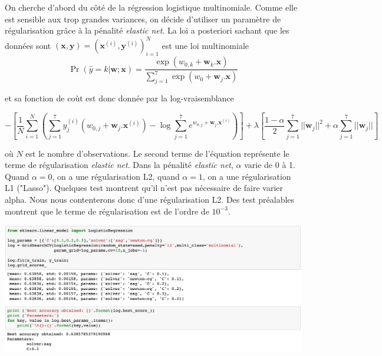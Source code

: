 \documentclass[12pt,a4paper]{article}
\numberwithin{equation}{section}
\begin{document}
	On cherche d'abord du côté de la régression logistique multinomiale. Comme elle est sensible aux trop grandes variances, on décide d'utiliser un paramètre de régularisation grâce à la pénalité \textit{elastic net}. La loi a posteriori sachant que les données sont $(\textbf{x},\textbf{y}) = (\textbf{x}^{(i)},\textbf{y}^{(i)})_{i=1}^N$ est une loi multinomiale 
	$$\Pr (\widehat{y}=k \vert \textbf{w};\textbf{x}) = \frac{\exp(w_{0,k} + \textbf{w}_k .\textbf{x})}{\sum_{j=1}^7 \exp(w_0 + \textbf{w}_j . \textbf{x})} $$ 
	
	et sa fonction de coùt est donc donnée par la log-vraisemblance 
	
	$$- \left[\frac{1}{N} \sum_{i=1}^{N} \left( \sum_{j=1}^7 y^{(i)}_j (w_{0,j} + \textbf{w}_j.\textbf{x}^{(i)}) - \log \sum_{j=1}^7 e^{w_{0,j} + \textbf{w}_j . \textbf{x}^{(i)}} \right) \right] + \lambda \left[ \frac{1 - \alpha}{2} \sum_{j=1}^7 \vert \vert \textbf{w}_j \vert \vert^2 + \alpha \sum_{j=1}^7 \vert \vert \textbf{w}_j \vert \vert \right]$$
	
	où $N$ est le nombre d'observations. Le second terme de l'équation représente le terme de régularisation \textit{elastic net}. Dans la pénalité \textit{elastic net}, $\alpha$ varie de 0 à 1. Quand $\alpha=0$, on a une régularisation L2, quand $\alpha=1$, on a une régularisation L1 ("Lasso"). Quelques test montrent qu'il n'est pas nécessaire de faire varier alpha. Nous nous contenterons donc d'une régularisation L2. Des test préalables montrent que le terme de régularisation est de l'ordre de $10^{-3}$.\\
	
	\begin{flushleft}
		\includegraphics[width=1\linewidth]{logregram}
	\end{flushleft}
	
\end{document}
